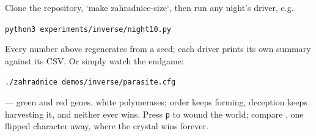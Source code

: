 \medskip
{} Clone the repository, `make
zahradnice-size`, then run any night's driver, e.g.
\medskip
\centerline{\tt python3 experiments/inverse/night10.py}
\medskip
\noindent Every number above regenerates from a seed; each driver
prints its own summary against its CSV. Or simply watch the
endgame:
\medskip
\centerline{\tt ./zahradnice demos/inverse/parasite.cfg}
\medskip
\noindent --- green and red genes, white polymerases; order keeps
forming, deception keeps harvesting it, and neither ever wins.
Press {\tt p} to wound the world; compare
, one flipped character away, where
the crystal wins forever.

\bye
